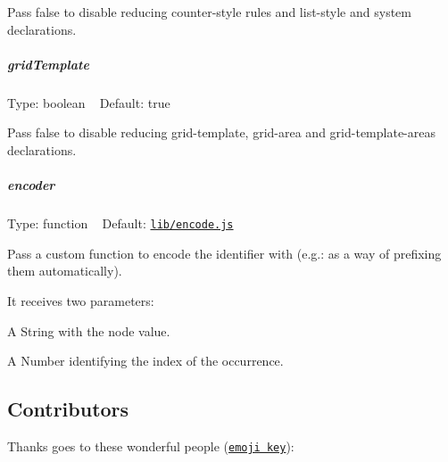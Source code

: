 Pass {\ttfamily false} to disable reducing {\ttfamily counter-\/style} rules and {\ttfamily list-\/style} and {\ttfamily system} declarations.

\subparagraph*{grid\+Template}

Type\+: {\ttfamily boolean} ~\newline
Default\+: {\ttfamily true}

Pass {\ttfamily false} to disable reducing {\ttfamily grid-\/template}, {\ttfamily grid-\/area} and {\ttfamily grid-\/template-\/areas} declarations.

\subparagraph*{encoder}

Type\+: {\ttfamily function} ~\newline
Default\+: \href{https://github.com/ben-eb/postcss-reduce-idents/blob/master/src/lib/encode.js}{\tt {\ttfamily lib/encode.\+js}}

Pass a custom function to encode the identifier with (e.\+g.\+: as a way of prefixing them automatically).

It receives two parameters\+:
\begin{DoxyItemize}
\item A {\ttfamily String} with the node value.
\item A {\ttfamily Number} identifying the index of the occurrence.
\end{DoxyItemize}

\subsection*{Contributors}

Thanks goes to these wonderful people (\href{https://github.com/kentcdodds/all-contributors#emoji-key}{\tt emoji key})\+:

